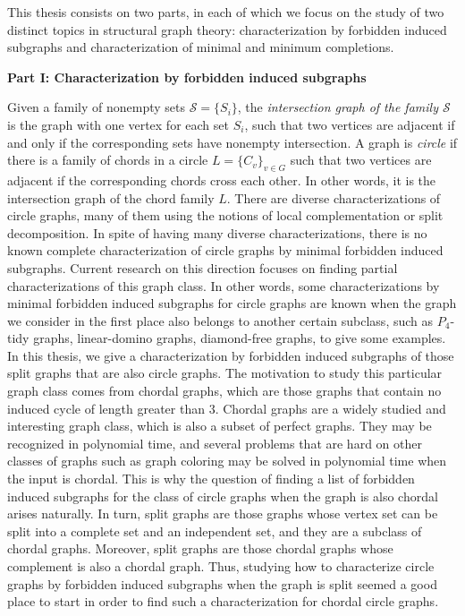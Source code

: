\documentclass[12pt]{book}
\theoremstyle{plain}
\theoremstyle{remark}
\begin{document}
This thesis consists on two parts, in each of which we focus on the study of two distinct topics in structural graph theory: characterization by forbidden induced subgraphs and characterization of minimal and minimum completions.

\vspace{3mm}
\textbf{Part I: Characterization by forbidden induced subgraphs}
\vspace{3mm}


Given a family of nonempty sets $\mathcal{S} = \{S_i\}$, the \emph{intersection graph of the family $\mathcal{S}$} is the graph with one vertex for each set $S_i$, such that two vertices are adjacent if and only if the corresponding sets have nonempty intersection. A graph is \emph{circle} if there is a family of chords in a circle $L= \{ C_v \}_{v\in G}$ such that two vertices are adjacent if the corresponding chords cross each other. In other words, it is the intersection graph of the chord family $L$.
There are diverse characterizations of circle graphs, many of them using the notions of local complementation or split decomposition. In spite of having many diverse characterizations, there is no known complete characterization of circle graphs by minimal forbidden induced subgraphs.
Current research on this direction focuses on finding partial characterizations of this graph class. In other words, some characterizations by minimal forbidden induced subgraphs for circle graphs are known when the graph we consider in the first place also belongs to another certain subclass, such as $P_4$-tidy graphs, linear-domino graphs, diamond-free graphs, to give some examples.
In this thesis, we give a characterization by forbidden induced subgraphs of those split graphs that are also circle graphs.
The motivation to study this particular graph class comes from chordal graphs, which are those graphs that contain no induced cycle of length greater than $3$. Chordal graphs are a widely studied and interesting graph class, which is also a subset of perfect graphs. They may be recognized in polynomial time, and several problems that are hard on other classes of graphs such as graph coloring may be solved in polynomial time when the input is chordal. This is why the question of finding a list of forbidden induced subgraphs for the class of circle graphs when the graph is also chordal arises naturally. In turn, split graphs are those graphs whose vertex set can be split into a complete set and an independent set, and they are a subclass of chordal graphs. Moreover, split graphs are those chordal graphs whose complement is also a chordal graph. Thus, studying how to characterize circle graphs by forbidden induced subgraphs when the graph is split seemed a good place to start in order to find such a characterization for chordal circle graphs.
\end{document}
